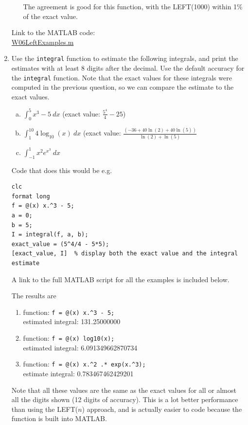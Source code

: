 \begin{enumerate}[1.]
\begin{Solution}
\begin{enumerate}[(a)]
The agreement is good for this function, with the LEFT(1000) within 1\% of the exact value.
\end{enumerate} 
Link to the MATLAB code: \\
\href{http://www.mast.queensu.ca/~apsc171/MNTCP01/PracticeProblems/MATLAB/W06LeftExamples.m}{W06LeftExamples.m}
\end{Solution}


\item 
  \begin{Question}
    Use the \verb#integral# function to estimate the following
    integrals, and print the estimates with at least 8 digits after
    the decimal.  Use the default accuracy for the \verb#integral#
    function.  Note that the exact values for these integrals were
    computed in the previous question, so we can compare the
    \verb@integral@ estimate to the exact values.
\begin{enumerate}[(a)]
\item $\displaystyle \int_0^5 x^3 - 5~dx$  (exact value: $\displaystyle \frac{5^4}{4} - 25$)
\item $\displaystyle \int_1^{10} 4 \log_{10}(x)~dx$ (exact value: 
$\displaystyle \frac{(-36+40 \ln(2)+40 \ln(5))}{\ln(2)+\ln(5)}$
\item $\displaystyle \int_{-1}^{1} x^2 e^{x^3}~dx$ 
\end{enumerate}
  \end{Question}

\begin{Solution} 
Code that does this would be e.g.
\begin{verbatim}
clc
format long
f = @(x) x.^3 - 5;
a = 0;
b = 5;
I = integral(f, a, b);
exact_value = (5^4/4 - 5*5);
[exact_value, I]  % display both the exact value and the integral estimate
\end{verbatim}
A link to the full MATLAB script for all the examples is included below.

The results are
\begin{enumerate}
\item function: \verb#f = @(x) x.^3 - 5;# \\
estimated integral: 131.25000000
\item function: \verb#f = @(x) log10(x);# \\
estimated integral: 6.091349662870734
\item function: \verb#f = @(x) x.^2 .* exp(x.^3);#\\
estimate integral: 0.783467462429201
\end{enumerate}
Note that all these values are the same as the exact values for all or
almost all the digits shown (12 digits of accuracy).  This is a lot
better performance than using the LEFT($n$) approach, and is actually
easier to code because the \verb@integral@ function is built into
MATLAB.


\end{Solution}
\end{enumerate}
